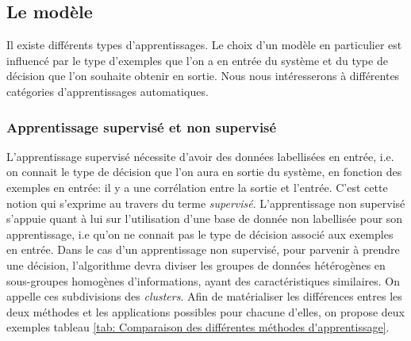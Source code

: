 \subsection{Le modèle}
\label{Le Machine Learning: Généralités sur le Machine Learning: Le modèle}
Il existe différents types d'apprentissages. Le choix d'un modèle en particulier est influencé par le type d'exemples que l'on a en entrée du système et du type de décision que l'on souhaite obtenir en sortie. Nous nous intéresserons à différentes catégories d'apprentissages automatiques.

\subsubsection{Apprentissage supervisé et non supervisé} 
\label{Le Machine Learning: Généralités sur le Machine Learning: Le modèle: apprentissage supervisé et non supervisé}
L'apprentissage supervisé nécessite d'avoir des données labellisées en entrée, i.e. on connait le type de décision que l'on aura en sortie du système, en fonction des exemples en entrée: il y a une corrélation entre la sortie et l'entrée. C'est cette notion qui s'exprime au travers du terme \emph{supervisé}. 
L'apprentissage non supervisé s'appuie quant à lui sur l'utilisation d'une base de donnée non labellisée pour son apprentissage, i.e qu'on ne connait pas le type de décision associé aux exemples en entrée. Dans le cas d'un apprentissage non supervisé, pour parvenir à prendre une décision, l'algorithme devra diviser les groupes de données hétérogènes en sous-groupes homogènes d'informations, ayant des caractéristiques similaires. On appelle ces subdivisions des \emph{clusters}.
Afin de matérialiser les différences entres les deux méthodes et les applications possibles pour chacune d'elles, on propose deux exemples tableau \ref {tab: Comparaison des différentes méthodes d'apprentissage}.

